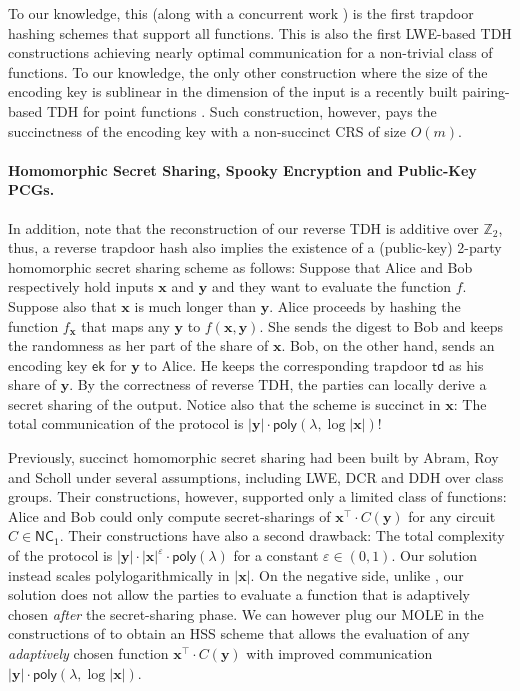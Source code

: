 \documentclass{theoretics}
\newcommand{\ek}{\mathsf{ek}}
\newcommand{\td}{\mathsf{td}}
\newcommand{\Z}{\mathbb{Z}}
\newcommand{\poly}{\mathsf{poly}}
\renewcommand{\sec}{\ensuremath{\lambda}}
\begin{document}
To our knowledge, this (along with a concurrent work \cite{EC:BJSS25}) is the first trapdoor hashing schemes that support all functions. This is also the first LWE-based TDH constructions achieving nearly optimal communication for a non-trivial class of functions. To our knowledge, the only other construction where the size of the encoding key is sublinear in the dimension of the input is a recently built pairing-based TDH for point functions \cite{Nico}. Such construction, however, pays the succinctness of the encoding key with a non-succinct CRS of size $O(m)$.


\paragraph{Homomorphic Secret Sharing, Spooky Encryption and Public-Key PCGs.}
In addition, note that the reconstruction of our reverse TDH is additive over $\Z_2$, thus, a reverse trapdoor hash also implies the existence of a (public-key) 2-party homomorphic secret sharing \cite{C:BoyGilIsh16} scheme as follows: Suppose that Alice and Bob respectively hold inputs $\mathbf{x}$ and $\mathbf{y}$ and they want to evaluate the function $f$. Suppose also that $\mathbf{x}$ is much longer than $\mathbf{y}$. Alice proceeds by hashing the function $f_\mathbf{x}$ that maps any $\mathbf{y}$ to $f(\mathbf{x}, \mathbf{y})$. She sends the digest to Bob and keeps the randomness as her part of the share of $\mathbf{x}$. Bob, on the other hand, sends an encoding key $\ek$ for $\mathbf{y}$ to Alice. He keeps the corresponding trapdoor $\td$ as his share of $\mathbf{y}$. By the correctness of reverse TDH, the parties can locally derive a secret sharing of the output. Notice also that the scheme is succinct in $\mathbf{x}$: The total communication of the protocol is $\lvert \mathbf{y}\rvert \cdot \poly(\sec, \log \lvert \mathbf{x}\rvert)$!

Previously, succinct homomorphic secret sharing had been built by Abram, Roy and Scholl \cite{EC:AbrRoySch24} under several assumptions, including LWE, DCR and DDH over class groups. Their constructions, however, supported only a limited class of functions: Alice and Bob could only compute secret-sharings of $\mathbf{x}^\intercal\cdot C(\mathbf{y})$ for any circuit $C\in\mathsf{NC}_1$. Their constructions have also a second drawback: The total complexity of the protocol is $\lvert \mathbf{y}\rvert \cdot \lvert \mathbf{x}\rvert^\varepsilon \cdot \poly(\sec)$ for a constant $\varepsilon\in (0, 1)$. Our solution instead scales polylogarithmically in $\lvert \mathbf{x}\rvert$. On the negative side, unlike \cite{EC:AbrRoySch24}, our solution does not allow the parties to evaluate a function that is adaptively chosen \emph{after} the secret-sharing phase. We can however plug our MOLE in the constructions of \cite{EC:AbrRoySch24} to obtain an HSS scheme that allows the evaluation of any \emph{adaptively} chosen function $\mathbf{x}^\intercal\cdot C(\mathbf{y})$ with improved communication $\lvert \mathbf{y}\rvert \cdot \poly(\sec, \log \lvert \mathbf{x}\rvert)$. 
\end{document}
